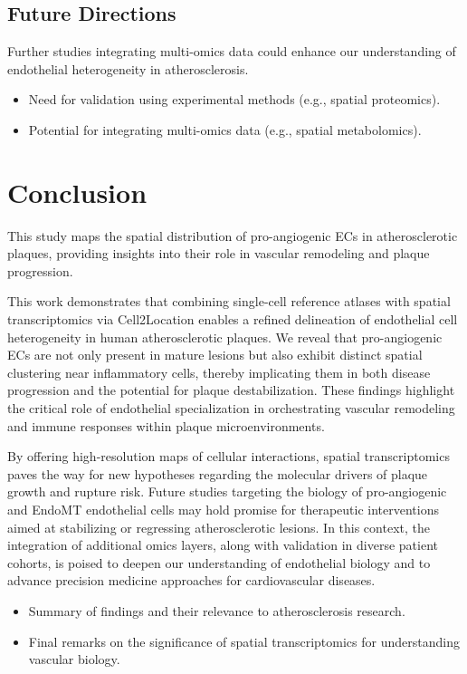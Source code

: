 \documentclass[a4paper,12pt]{article}
\begin{document}
\subsection{Future Directions}
Further studies integrating multi-omics data could enhance our understanding of endothelial heterogeneity in atherosclerosis.

\begin{itemize}
  \item Need for validation using experimental methods (e.g., spatial proteomics).
  \item Potential for integrating multi-omics data (e.g., spatial metabolomics).
\end{itemize}



\section{Conclusion}
This study maps the spatial distribution of pro-angiogenic ECs in atherosclerotic plaques, providing insights into their role in vascular remodeling and plaque progression.

This work demonstrates that combining single-cell reference atlases with spatial transcriptomics via Cell2Location enables a refined delineation of endothelial cell heterogeneity in human atherosclerotic plaques. We reveal that pro-angiogenic ECs are not only present in mature lesions but also exhibit distinct spatial clustering near inflammatory cells, thereby implicating them in both disease progression and the potential for plaque destabilization. These findings highlight the critical role of endothelial specialization in orchestrating vascular remodeling and immune responses within plaque microenvironments.

By offering high-resolution maps of cellular interactions, spatial transcriptomics paves the way for new hypotheses regarding the molecular drivers of plaque growth and rupture risk. Future studies targeting the biology of pro-angiogenic and EndoMT endothelial cells may hold promise for therapeutic interventions aimed at stabilizing or regressing atherosclerotic lesions. In this context, the integration of additional omics layers, along with validation in diverse patient cohorts, is poised to deepen our understanding of endothelial biology and to advance precision medicine approaches for cardiovascular diseases.

\begin{itemize}
  \item Summary of findings and their relevance to atherosclerosis research.
  \item Final remarks on the significance of spatial transcriptomics for understanding vascular biology.
\end{itemize}




\end{document}
